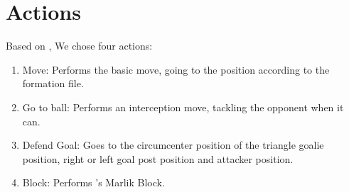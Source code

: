 \section{Actions}
Based on \cite{cyrus}, We chose four actions: 
\begin{enumerate}
    \item Move: Performs the basic move, going to the position according to the formation file.
    \item Go to ball: Performs an interception move, tackling the opponent when it can.
    \item Defend Goal: Goes to the circumcenter position of the triangle goalie position, right or left goal post position and attacker position.
    \item Block: Performs \cite{marlik2011}'s Marlik Block.
\end{enumerate}